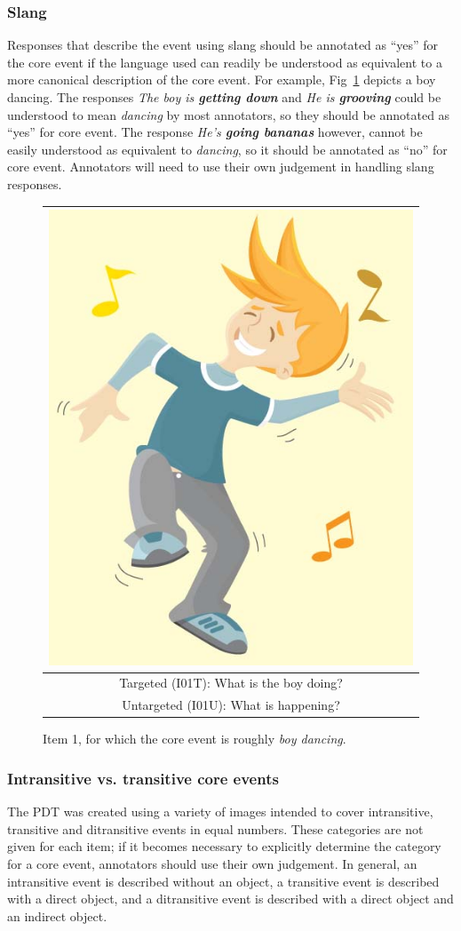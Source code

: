 \documentclass[12pt,notitlepage]{article}
\begin{document}
\subsubsection{Slang} Responses that describe the event using slang should be annotated as ``yes'' for the core event if the language used can readily be understood as equivalent to a more canonical description of the core event. For example, Fig~\ref{fig:dance} depicts a boy dancing. The responses \textit{The boy is \textbf{getting down}} and \textit{He is \textbf{grooving}} could be understood to mean \textit{dancing} by most annotators, so they should be annotated as ``yes'' for core event. The response \textit{He's \textbf{going bananas}} however, cannot be easily understood as equivalent to \textit{dancing}, so it should be annotated as ``no'' for core event. Annotators will need to use their own judgement in handling slang responses.

\begin{figure}[h]
\begin{center}
\begin{tabular}{|c|}
\hline
\includegraphics[width=0.4\columnwidth,trim=0 0 0 -3]{figures/I01.jpg}\\
\hline
Targeted (I01T): What is the boy doing?\\
\hline
Untargeted (I01U): What is happening? \\
\hline
\end{tabular}
\end{center}
\caption{Item 1, for which the core event is roughly \textit{boy dancing}.}
\label{fig:dance}
\end{figure}

\subsubsection{Intransitive vs. transitive core events} The PDT was created using a variety of images intended to cover intransitive, transitive and ditransitive events in equal numbers. These categories are not given for each item; if it becomes necessary to explicitly determine the category for a core event, annotators should use their own judgement. In general, an intransitive event is described without an object, a transitive event is described with a direct object, and a ditransitive event is described with a direct object and an indirect object.
\end{document}
